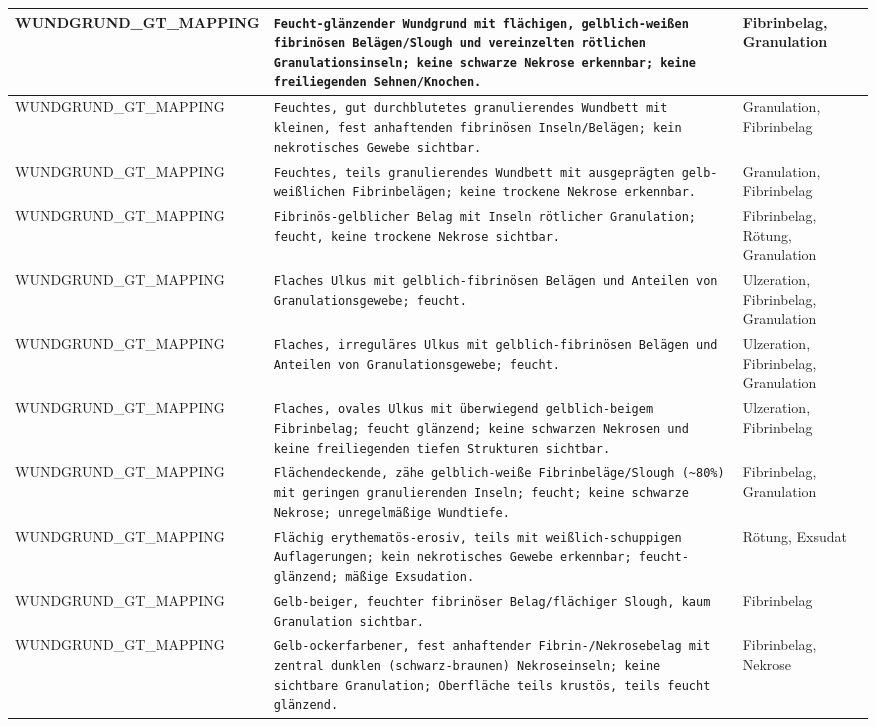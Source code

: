 \begin{longtable}{|p{3.5cm}|p{5cm}|p{6.5cm}|}
WUNDGRUND\_GT\_MAPPING & \texttt{Feucht-glänzender Wundgrund mit flächigen, gelblich-weißen fibrinösen Belägen/Slough und vereinzelten rötlichen Granulationsinseln; keine schwarze Nekrose erkennbar; keine freiliegenden Sehnen/Knochen.} & Fibrinbelag, Granulation \\ \hline
WUNDGRUND\_GT\_MAPPING & \texttt{Feuchtes, gut durchblutetes granulierendes Wundbett mit kleinen, fest anhaftenden fibrinösen Inseln/Belägen; kein nekrotisches Gewebe sichtbar.} & Granulation, Fibrinbelag \\ \hline
WUNDGRUND\_GT\_MAPPING & \texttt{Feuchtes, teils granulierendes Wundbett mit ausgeprägten gelb-weißlichen Fibrinbelägen; keine trockene Nekrose erkennbar.} & Granulation, Fibrinbelag \\ \hline
WUNDGRUND\_GT\_MAPPING & \texttt{Fibrinös-gelblicher Belag mit Inseln rötlicher Granulation; feucht, keine trockene Nekrose sichtbar.} & Fibrinbelag, Rötung, Granulation \\ \hline
WUNDGRUND\_GT\_MAPPING & \texttt{Flaches Ulkus mit gelblich-fibrinösen Belägen und Anteilen von Granulationsgewebe; feucht.} & Ulzeration, Fibrinbelag, Granulation \\ \hline
WUNDGRUND\_GT\_MAPPING & \texttt{Flaches, irreguläres Ulkus mit gelblich-fibrinösen Belägen und Anteilen von Granulationsgewebe; feucht.} & Ulzeration, Fibrinbelag, Granulation \\ \hline
WUNDGRUND\_GT\_MAPPING & \texttt{Flaches, ovales Ulkus mit überwiegend gelblich-beigem Fibrinbelag; feucht glänzend; keine schwarzen Nekrosen und keine freiliegenden tiefen Strukturen sichtbar.} & Ulzeration, Fibrinbelag \\ \hline
WUNDGRUND\_GT\_MAPPING & \texttt{Flächendeckende, zähe gelblich-weiße Fibrinbeläge/Slough (\textasciitilde{}80\%) mit geringen granulierenden Inseln; feucht; keine schwarze Nekrose; unregelmäßige Wundtiefe.} & Fibrinbelag, Granulation \\ \hline
WUNDGRUND\_GT\_MAPPING & \texttt{Flächig erythematös-erosiv, teils mit weißlich-schuppigen Auflagerungen; kein nekrotisches Gewebe erkennbar; feucht-glänzend; mäßige Exsudation.} & Rötung, Exsudat \\ \hline
WUNDGRUND\_GT\_MAPPING & \texttt{Gelb-beiger, feuchter fibrinöser Belag/flächiger Slough, kaum Granulation sichtbar.} & Fibrinbelag \\ \hline
WUNDGRUND\_GT\_MAPPING & \texttt{Gelb-ockerfarbener, fest anhaftender Fibrin-/Nekrosebelag mit zentral dunklen (schwarz-braunen) Nekroseinseln; keine sichtbare Granulation; Oberfläche teils krustös, teils feucht glänzend.} & Fibrinbelag, Nekrose \\ \hline

\end{longtable}
